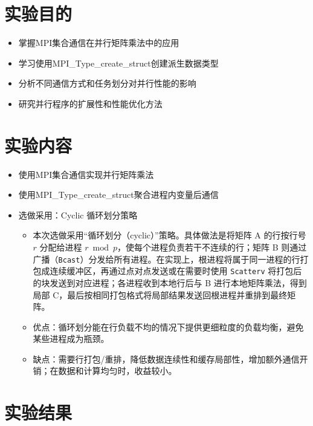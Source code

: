 \documentclass{SYSUReport}
\date{2025年4月2日}
\begin{document}
\cover
\thispagestyle{empty} %
\clearpage

\section{实验目的}
\begin{itemize}
    \item 掌握MPI集合通信在并行矩阵乘法中的应用
    \item 学习使用MPI\_Type\_create\_struct创建派生数据类型
    \item 分析不同通信方式和任务划分对并行性能的影响
    \item 研究并行程序的扩展性和性能优化方法
\end{itemize}

\section{实验内容}
\begin{itemize}
    \item 使用MPI集合通信实现并行矩阵乘法
    \item 使用MPI\_Type\_create\_struct聚合进程内变量后通信
    \item 选做采用：Cyclic 循环划分策略
    \begin{itemize}
        \item 本次选做采用“循环划分（cyclic）”策略。具体做法是将矩阵 A 的行按行号 $r$ 分配给进程 $r\bmod p$，使每个进程负责若干不连续的行；矩阵 B 则通过广播（\texttt{Bcast}）分发给所有进程。在实现上，根进程将属于同一进程的行打包成连续缓冲区，再通过点对点发送或在需要时使用 \texttt{Scatterv} 将打包后的块发送到对应进程；各进程收到本地行后与 B 进行本地矩阵乘法，得到局部 C，最后按相同打包格式将局部结果发送回根进程并重排到最终矩阵。
        \item 优点：循环划分能在行负载不均的情况下提供更细粒度的负载均衡，避免某些进程成为瓶颈。
        \item 缺点：需要行打包/重排，降低数据连续性和缓存局部性，增加额外通信开销；在数据和计算均匀时，收益较小。
    \end{itemize}
\end{itemize}

\newpage
\section{实验结果}
\end{document}
